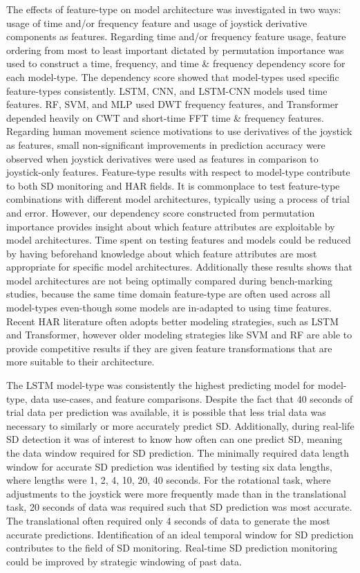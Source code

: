 \documentclass{ieeeaccess}
\begin{document}
The effects of feature-type on model architecture was investigated in two ways: usage of time and/or frequency feature and usage of joystick derivative components as features.  Regarding time and/or frequency feature usage, feature ordering from most to least important dictated by permutation importance was used to construct a time, frequency, and time \& frequency dependency score for each model-type. The dependency score showed that model-types used specific feature-types consistently. LSTM, CNN, and LSTM-CNN models used time features. RF, SVM, and MLP used DWT frequency features, and Transformer depended heavily on CWT and short-time FFT time \& frequency features. Regarding human movement science motivations to use derivatives of the joystick as features, small non-significant improvements in prediction accuracy were observed when joystick derivatives were used as features in comparison to joystick-only features. Feature-type results with respect to model-type contribute to both SD monitoring and HAR fields. It is commonplace to test feature-type combinations with different model architectures, typically using a process of trial and error. However, our dependency score constructed from permutation importance provides insight about which feature attributes are exploitable by model architectures. Time spent on testing features and models could be reduced by having beforehand knowledge about which feature attributes are most appropriate for specific model architectures. Additionally these results shows that model architectures are not being optimally compared during bench-marking studies, because the same time domain feature-type are often used across all model-types even-though some models are in-adapted to using time features. Recent HAR literature often adopts better modeling strategies, such as LSTM and Transformer, however older modeling strategies like SVM and RF are able to provide competitive results if they are given feature transformations that are more suitable to their architecture.

The LSTM model-type was consistently the highest predicting model for model-type, data use-cases, and feature comparisons. Despite the fact that 40 seconds of trial data per prediction was available, it is possible that less trial data was necessary to similarly or more accurately predict SD. Additionally, during real-life SD detection it was of interest to know how often can one predict SD, meaning the data window required for SD prediction. The minimally required data length window for accurate SD prediction was identified by testing six data lengths, where lengths were 1, 2, 4, 10, 20, 40 seconds. For the rotational task, where adjustments to the joystick were more frequently made than in the translational task, 20 seconds of data was required such that SD prediction was most accurate. The translational often required only 4 seconds of data to generate the most accurate predictions. Identification of an ideal temporal window for SD prediction contributes to the field of SD monitoring. Real-time SD prediction monitoring could be improved by strategic windowing of past data.
\end{document}
